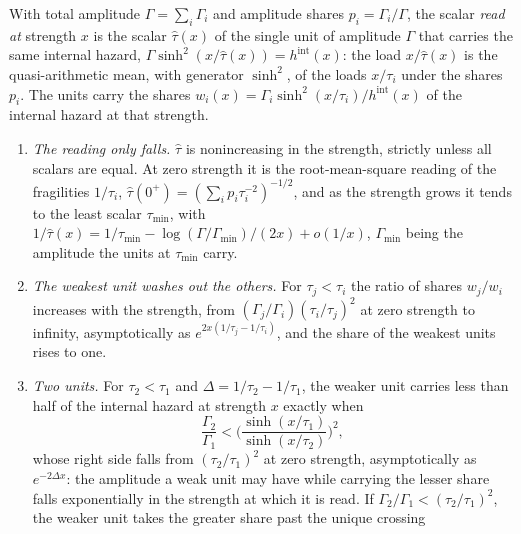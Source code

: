 \begin{definition}\label{gr:def:reading}
With total amplitude $\Gamma=\sum_i\Gamma_i$ and amplitude shares
$p_i=\Gamma_i/\Gamma$, the scalar \emph{read at} strength $x$ is the scalar
$\hat\tau(x)$ of the single unit of amplitude $\Gamma$ that carries the
same internal hazard, $\Gamma\sinh^2(x/\hat\tau(x))=h^{\mathrm{int}}(x)$:
the load $x/\hat\tau(x)$ is the quasi-arithmetic mean, with generator
$\sinh^2$, of the loads $x/\tau_i$ under the shares $p_i$. The units carry
the shares $w_i(x)=\Gamma_i\sinh^2(x/\tau_i)/h^{\mathrm{int}}(x)$ of the
internal hazard at that strength.
\end{definition}

\begin{proposition}\label{gr:prop:zeromark}
\leavevmode
\begin{enumerate}
\item[(i)] \emph{The reading only falls.} $\hat\tau$ is nonincreasing in
the strength, strictly unless all scalars are equal. At zero strength it
is the root-mean-square reading of the fragilities $1/\tau_i$,
$\hat\tau(0^+)=(\sum_ip_i\tau_i^{-2})^{-1/2}$, and as the strength grows
it tends to the least scalar $\tau_{\min}$, with
$1/\hat\tau(x)=1/\tau_{\min}-\log(\Gamma/\Gamma_{\min})/(2x)+o(1/x)$,
$\Gamma_{\min}$ being the amplitude the units at $\tau_{\min}$ carry.
\item[(ii)] \emph{The weakest unit washes out the others.} For
$\tau_j<\tau_i$ the ratio of shares $w_j/w_i$ increases with the
strength, from $(\Gamma_j/\Gamma_i)(\tau_i/\tau_j)^2$ at zero strength to
infinity, asymptotically as $e^{2x(1/\tau_j-1/\tau_i)}$, and the share of
the weakest units rises to one.
\item[(iii)] \emph{Two units.} For $\tau_2<\tau_1$ and
$\Delta=1/\tau_2-1/\tau_1$, the weaker unit carries less than half of the
internal hazard at strength $x$ exactly when
\begin{equation}\label{gr:eq:zeromark}
\frac{\Gamma_2}{\Gamma_1}<\bigg(\frac{\sinh(x/\tau_1)}{\sinh(x/\tau_2)}\bigg)^{2},
\end{equation}
whose right side falls from $(\tau_2/\tau_1)^2$ at zero strength,
asymptotically as $e^{-2\Delta x}$: the amplitude a weak unit may have
while carrying the lesser share falls exponentially in the strength at
which it is read. If $\Gamma_2/\Gamma_1<(\tau_2/\tau_1)^2$, the weaker unit
takes the greater share past the unique crossing
\begin{equation}\label{gr:eq:crossing}

\end{equation}
\end{enumerate}
\end{proposition}
